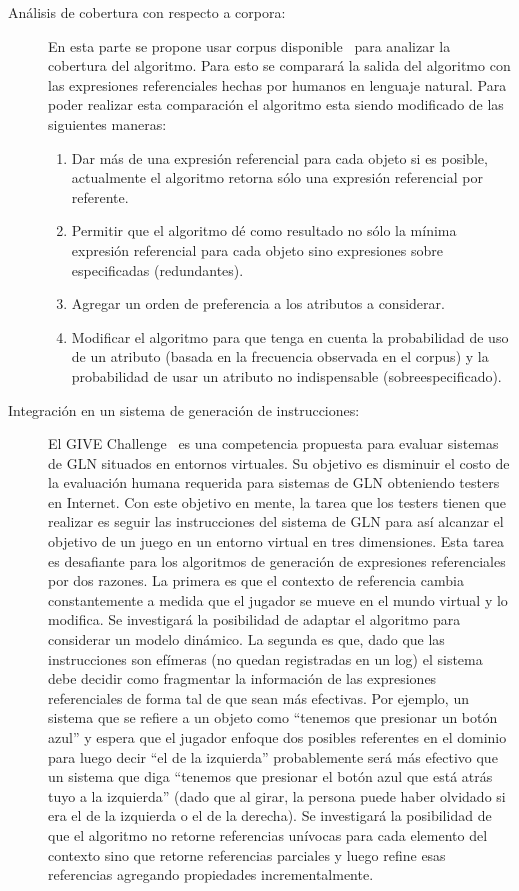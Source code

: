 \begin{description}
\item[An\'alisis de cobertura con respecto a corpora:] En esta parte se propone usar corpus disponible~\cite{viethen-dale:2011:UCNLG+Eval} para analizar la cobertura del algoritmo. Para esto se comparar\'a la salida del algoritmo con las expresiones referenciales hechas por humanos en lenguaje natural. Para poder realizar esta comparaci\'on el algoritmo esta siendo modificado de las siguientes maneras:
\begin{enumerate}
   \item Dar m\'as de una expresi\'on referencial para cada objeto si es posible, actualmente el algoritmo retorna s\'olo una expresi\'on referencial por referente.
   \item Permitir que el algoritmo d\'e como resultado no s\'olo la m\'inima expresi\'on referencial para cada objeto sino expresiones sobre especificadas (redundantes).
   \item Agregar un orden de preferencia a los atributos a considerar.
   \item Modificar el algoritmo para que tenga en cuenta la probabilidad de uso de un atributo (basada en la frecuencia observada en el corpus) y la probabilidad de usar un atributo no indispensable (sobreespecificado).
\end{enumerate}
\item[Integraci\'on en un sistema de generaci\'on de instrucciones:] El GIVE Challenge~\cite{KolByrCasDalStrMooObe09} es una competencia propuesta para evaluar sistemas de GLN situados en entornos virtuales. Su objetivo es disminuir el costo de la evaluaci\'on humana requerida para sistemas de GLN obteniendo testers en Internet. Con este objetivo en mente, la tarea que los testers tienen que realizar es seguir las instrucciones del sistema de GLN para as\'i alcanzar el objetivo de un juego en un entorno virtual en tres dimensiones. Esta tarea es desafiante para los algoritmos de generaci\'on de expresiones referenciales por dos razones. La primera es que el contexto de referencia cambia constantemente a medida que el jugador se mueve en el mundo virtual y lo modifica. Se investigar\'a la posibilidad de adaptar el algoritmo para considerar un modelo din\'amico. La segunda es que, dado que las instrucciones son ef\'imeras (no quedan registradas en un log) el sistema debe decidir como fragmentar la informaci\'on de las expresiones referenciales de forma tal de que sean m\'as efectivas. Por ejemplo, un sistema que se refiere a un objeto como ``tenemos que presionar un bot\'on azul'' y espera que el jugador enfoque dos posibles referentes en el dominio para luego decir ``el de la izquierda'' probablemente ser\'a m\'as efectivo que un sistema que diga ``tenemos que presionar el bot\'on azul que est\'a atr\'as tuyo a la izquierda'' (dado que al girar, la persona puede haber olvidado si era el de la izquierda o el de la derecha). Se investigar\'a la posibilidad de que el algoritmo no retorne referencias un\'ivocas para cada elemento del contexto sino que retorne referencias parciales y luego refine esas referencias agregando propiedades incrementalmente. 
\end{description}

